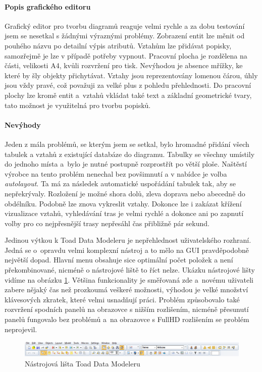 \documentclass[czech,bachelor,public,dept460,male,oneside]{diploma}
\begin{document}
		\paragraph{Popis grafického editoru}
		Grafický editor pro tvorbu diagramů reaguje velmi rychle a za dobu testování jsem se nesetkal s žádnými výraznými problémy. Zobrazení entit lze měnit od  pouhého názvu po detailní výpis atributů. Vztahům lze přidávat popisky, samozřejmě je lze v případě potřeby vypnout. Pracovní plocha je rozdělena na části, velikosti A4, kvůli rozvržení pro tisk. Nevýhodou je absence mřížky, ke které by šly objekty přichytávat. Vztahy jsou reprezentovány lomenou čárou, úhly jsou vždy pravé, což považuji za velké plus z pohledu přehlednosti. Do pracovní plochy lze kromě entit a~vztahů vkládat také text a základní geometrické tvary, tato možnost je využitelná pro tvorbu popisků.
		
		\paragraph{Nevýhody}
		Jeden z mála problémů, se kterým jsem se setkal, bylo hromadné přidání všech tabulek a vztahů z existující databáze do diagramu. Tabulky se všechny umístily do jednoho místa a~bylo je nutné postupně rozprostřít po větší ploše. Naštěstí výrobce na tento problém nenechal bez povšimnutí a v nabídce je volba \textit{autolayout}. Ta má za následek automatické uspořádání tabulek tak, aby se nepřekrývaly. Rozložení je možné shora dolů, zleva doprava nebo abecedně do obdélníku. Podobně lze znova vykreslit vztahy. Dokonce lze i zakázat křížení vizualizace vztahů, vyhledávání tras je velmi rychlé a dokonce ani po zapnutí volby pro co nejpřesnější trasy nepřesáhl čas přibližně pár sekund. 
		
		Jedinou výtkou k Toad Data Modeleru je nepřehlednost uživatelského rozhraní. Jedná se o~opravdu velmi komplexní nástroj a to mělo na GUI pravděpodobně největší dopad. Hlavní menu obsahuje sice optimální počet položek a není překombinované, nicméně o nástrojové liště to říct nelze. Ukázku nástrojové lišty vidíme na obrázku \ref{fig:toadMenu}. Většina funkcionality je směřovaná zde a~novému uživateli zabere nějaký čas než prozkoumá veškeré možnosti, výhodou je velké množství klávesových zkratek, které velmi usnadňují práci. Problém způsobovalo také rozvržení spodních panelů na obrazovce s nižším rozlišením, nicméně přesunutí panelů fungovalo bez problémů a~na obrazovce s FullHD rozlišením se problém neprojevil.
		
		\begin{figure}[!h]
			\centering
			\includegraphics[width=1\textwidth]{Figures/EditorToad}
			\caption[Nástrojová lišta Toad Data Modeleru]{Nástrojová lišta Toad Data Modeleru}
			\label{fig:toadMenu}
		\end{figure}
		
\end{document}
